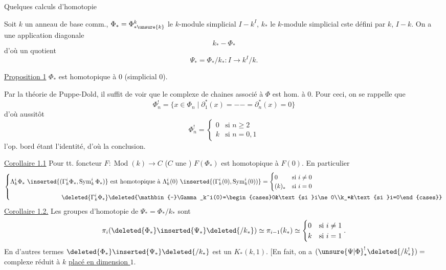 Quelques calculs d'homotopie

Soit $k$ un anneau de base comm.,
$\Phi_*=\Phi^k_{*\unsure{k}}$ le $k$-module simplicial $I\mathbin{-}k^I$,
$k_*$ le $k$-module simplicial cste défini par $k$, $I\mathbin{-}k$.
On a une application diagonale
\[k_*\mathbin{-}\Phi_*\]
d'où un quotient
\[\Psi_*=\Phi_*/k_*:I\longrightarrow k^I/k.\]

\uline{Proposition 1} $\Phi_*$ est homotopique à $0$ 
(simplicial $0$).

Par la théorie de Puppe-Dold, il suffit de voir que le complexe de chaines
\inserted{$\Phi_*^!$} associé \deleted{$\unsure{\Phi}$} à $\Phi$ est hom. à $0$.
Pour ceci, on se rappelle que
\[
\Phi_n^!=\{x\in\Phi_n\mid\partial_1^*(x)=- -=\partial_n^*(x)=0\}
\]
d'où aussitôt
\[
\Phi_n^!=\begin{cases}0&\text{si }n\geq2\\k&\text{si }n=0,1\end{cases}
\]
l'op.  bord
étant l'identité, d'où la conclusion.

\uline{Corollaire 1.1} Pour tt. foncteur $F:\operatorname{Mod}(k)\longrightarrow C$
($C$ une ) $F(\Phi_*)$ est homotopique à $F(0)$.
En particulier
\[
\left\{\begin{aligned}
\Lambda_k^i\Phi_*\ \inserted{(\Gamma_k^i\Phi_*,\operatorname{Sym}_k^i\Phi_*)}
&\text{ est homotopique à }\Lambda_k^i(0)\ \inserted{(\Gamma_k^i(0),\operatorname{Sym}_k^i(0))}
=\begin{cases}0&\text{si }i\ne0\\(k)_*&\text{si }i=0\end{cases}\\
\deleted{\Gamma_k^i\Phi_*}&\deleted{\mathbin{-}\Gamma_k^i(0)=\begin{cases}0&\text{si }i\ne0\\k_*&\text{si }i=0\end{cases}}
\end{aligned}\right.
\]
\uline{Corollaire 1.2.} Les groupes d'homotopie de $\Psi_*=\Phi_*/k_*$ sont
\[
\pi_i(\deleted{\Phi_*}\inserted{\Psi_*}\deleted{/k_*})
\simeq\pi_{i-1}(k_*)\simeq\begin{cases}0&\text{si }i\ne1\\k&\text{si }i=1\end{cases}.
\]
En d'autres termes $\deleted{\Phi_*}\inserted{\Psi_*}\deleted{/k_*}$ est un $K_*(k,1)$.
[En fait, on a $(\unsure{\Psi|\Phi}_*^!\deleted{/k_*^!})=$ complexe réduit à $k$ \uline{placé en dimension $1$}.

